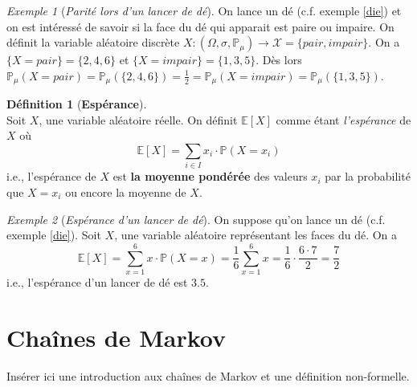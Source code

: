 \documentclass[12pt,a4paper]{report}
\theoremstyle{definition}%
\newtheorem{definition}{Définition}[chapter]
\theoremstyle{remark}
\newtheorem{example}{Exemple}[chapter]
\newcommand{\ie}{i.e., }
\newcommand{\cf}{c.f. }
\newcommand{\pr}{\mathbb{P}}
\begin{document}
\begin{example}[\textit{Parité lors d'un lancer de dé}]
	On lance un dé (\cf exemple \ref{die}) et on est intéressé de savoir si la face du dé qui apparait est paire ou impaire. On définit la variable aléatoire discrète $X:(\Omega, \sigma, \pr_{\mu}) \rightarrow \mathcal{X} = \{pair, impair\}$. On a $\{X = pair\} = \{2, 4, 6\}$ et $\{X = impair\} = \{1, 3, 5\}$. Dès lors $\pr_{\mu}(X = pair) = \pr_{\mu}(\{2, 4, 6\}) =\frac{1}{2} = \pr_{\mu}(X = impair) = \pr_{\mu}(\{1, 3, 5\})$.
\end{example}

\begin{definition}[\textbf{Espérance}]\label{espmath}\cite{Course2}\\
	Soit $X$, une variable aléatoire réelle. On définit $\mathbb{E}[X]$ comme étant \textit{l'espérance} de $X$ où
	\[\mathbb{E}[X] = \sum_{i \in I}x_i \cdot \pr(X = x_i) \]
	\ie l'espérance de $X$ est \textbf{la moyenne pondérée} des valeurs $x_i$ par la probabilité que $X = x_i$ ou encore la moyenne de $X$.

\end{definition}
\begin{example}[\textit{Espérance d'un lancer de dé}]
	On suppose qu'on lance un dé (\cf exemple \ref{die}). Soit $X$, une variable aléatoire représentant les faces du dé. On a
	\[ \mathbb{E}[X] = \sum_{x = 1}^6 x \cdot \pr(X = x)  = \frac{1}{6} \sum_{x = 1}^6 x = \frac{1}{6} \cdot \frac{6 \cdot 7}{2} = \frac{7}{2}\] \ie l'espérance d'un lancer de dé est $3.5$.
\end{example}


\chapter{Chaînes de Markov}

Insérer ici une introduction aux chaînes de Markov et une définition non-formelle.\\
\end{document}
